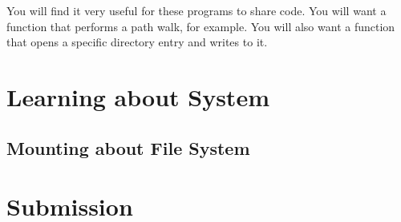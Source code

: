 \documentclass[12pt]{article}
\begin{document}
\bigskip

You will find it very useful for these programs to share code. You will want a
function that performs a path walk, for example. You will also want a function
that opens a specific directory entry and writes to it.


\bigskip

\section{Learning about System}

\bigskip

\subsection{Mounting about File System}

\bigskip

\section{Submission}
\end{document}
